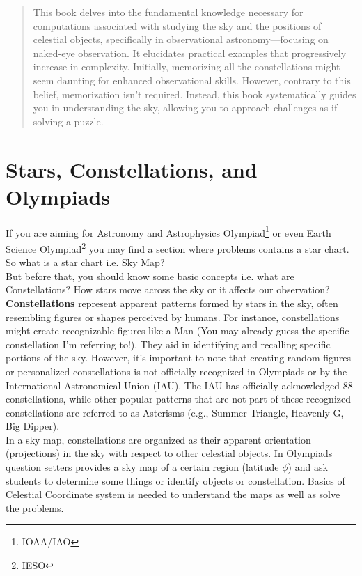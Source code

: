 \documentclass[a4paper,12pt]{extarticle}
\begin{document}
\clearpage
\begin{abstract}
{\color{RoyalBlue} This book delves into the fundamental knowledge necessary for computations associated with studying the sky and the positions of celestial objects, specifically in observational astronomy—focusing on naked-eye observation. It elucidates practical examples that progressively increase in complexity. Initially, memorizing all the constellations might seem daunting for enhanced observational skills. However, contrary to this belief, memorization isn't required. Instead, this book systematically guides you in understanding the sky, allowing you to approach challenges as if solving a puzzle.}
\end{abstract}
\section{Stars, Constellations, and Olympiads}
 
If you are aiming for Astronomy and Astrophysics Olympiad\footnote{IOAA/IAO} or even Earth Science Olympiad\footnote{IESO} you may find a section  where problems contains a star chart. So what is a star chart i.e. Sky Map?\\

But before that, you should know some basic concepts i.e. what are Constellations? How stars move across the sky or it affects our observation? \\

\textbf{Constellations} represent apparent patterns formed by stars in the sky, often resembling figures or shapes perceived by humans. For instance, constellations might create recognizable figures like a Man (You may already guess the specific constellation I'm referring to!). They aid in identifying and recalling specific portions of the sky. However, it's important to note that creating random figures or personalized constellations is not officially recognized in Olympiads or by the International Astronomical Union (IAU). The IAU has officially acknowledged 88 constellations, while other popular patterns that are not part of these recognized constellations are referred to as Asterisms (e.g., Summer Triangle, Heavenly G, Big Dipper).\\

In a sky map, constellations are organized as their apparent orientation (projections) in the sky with respect to other celestial objects. In Olympiads question setters provides a sky map of a certain region (latitude $\phi$) and ask students to determine some things or identify objects or constellation. Basics of Celestial Coordinate system is needed to understand the maps as well as solve the problems.
\end{document}
